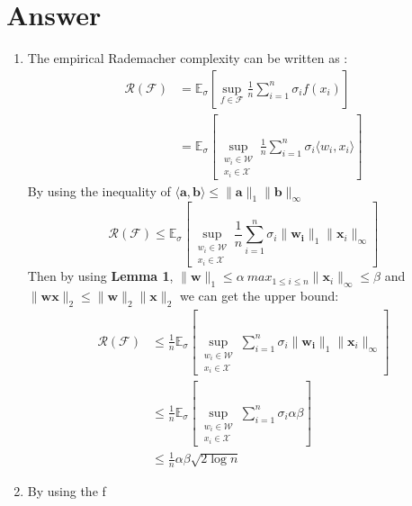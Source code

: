 \documentclass[
	12pt, %
]{fphw}
\begin{document}
\section*{Answer}
\begin{enumerate}
	\item The empirical Rademacher complexity can be written as :
	\begin{equation*}
		\begin{aligned}
			\mathcal{R}(\mathcal{F}) & ={\mathbb{E}_{\sigma}}\left[\sup_{f\in\mathcal{F}}\frac1n\sum_{i=1}^n\sigma_i f(x_i)\right] \\
									 & ={\mathbb{E}_{\sigma}}\left[\sup_{\substack{w_i\in\mathcal{W}\\x_i\in\mathcal{X}}}\frac1n\sum_{i=1}^n\sigma_i \langle w_i, x_i \rangle \right]
		\end{aligned}	
	\end{equation*}
	By using the inequality of $\langle\mathbf{a},\mathbf{b}\rangle\leq\|\mathbf{a}\|_1\|\mathbf{b}\|_\infty$
	\begin{equation*}
		\mathcal{R}(\mathcal{F})  \leq {\mathbb{E}_{\sigma}}\left[\sup_{\substack{w_i\in\mathcal{W}\\x_i\in\mathcal{X}}}\frac1n\sum_{i=1}^n\sigma_i \|\mathbf{w_i}\|_1 \|\mathbf{x} _i\|_\infty\right]								 
	\end{equation*}
	Then by using \textbf{Lemma 1},  $\|\mathbf{w}\|_1\leq\alpha\ max_{1\leq i\leq n}\|\mathbf{x} _i\|_\infty\leq \beta $ and $\|\mathbf{w x}\|_2 \leq \|\mathbf{w}\|_2\|\mathbf{x}\|_2$ we can get the upper bound:
	\begin{equation*}
		\begin{aligned}
		\mathcal{R}(\mathcal{F}) & \leq \frac1n{\mathbb{E}_{\sigma}}\left[\sup_{\substack{w_i\in\mathcal{W}\\x_i\in\mathcal{X}}}\sum_{i=1}^n\sigma_i \|\mathbf{w_i}\|_1 \|\mathbf{x} _i\|_\infty\right]	\\	
								 &\leq \frac1n{\mathbb{E}_{\sigma}}\left[\sup_{\substack{w_i\in\mathcal{W}\\x_i\in\mathcal{X}}}\sum_{i=1}^n\sigma_i \alpha \beta \right]	\\
								 & \leq \frac1n\alpha \beta \sqrt{2\log n}
	\end{aligned}
	\end{equation*}
	\item By using the f
\end{enumerate}





\end{document}
